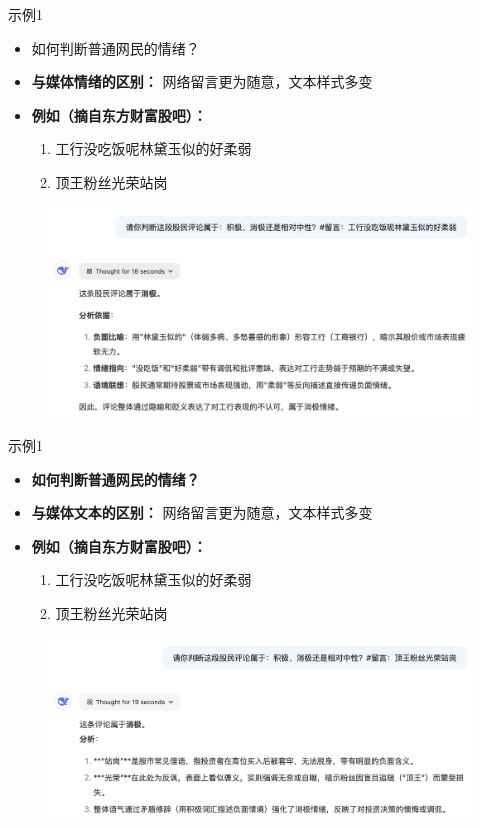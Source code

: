 \documentclass{beamer}
\begin{document}
\begin{frame}[fragile]{示例1}
  \begin{itemize}
    \item 如何判断普通网民的情绪？
    \item \textbf{与媒体情绪的区别：} 网络留言更为随意，文本样式多变
    \item \textbf{例如（摘自东方财富股吧）：}
  \begin{enumerate}
	\item 工行没吃饭呢林黛玉似的好柔弱
	\item 顶王粉丝光荣站岗
\end{enumerate}
  \end{itemize}
  \pause
    \begin{figure}[htpb]
  	\centering
  	\includegraphics[width=0.9\linewidth]{figs/林黛玉.png}
  \end{figure}
\end{frame}
\begin{frame}[fragile]{示例1}
	\begin{itemize}
		\item\textbf{ 如何判断普通网民的情绪？}
		\item \textbf{与媒体文本的区别：} 网络留言更为随意，文本样式多变
		\item \textbf{例如（摘自东方财富股吧）：}
		\begin{enumerate}
			\item 工行没吃饭呢林黛玉似的好柔弱
			\item 顶王粉丝光荣站岗
		\end{enumerate}
	\end{itemize}
	\begin{figure}[htpb]
		\centering
		\includegraphics[width=0.9\linewidth]{figs/顶王.png}
	\end{figure}
\end{frame}
\end{document}
